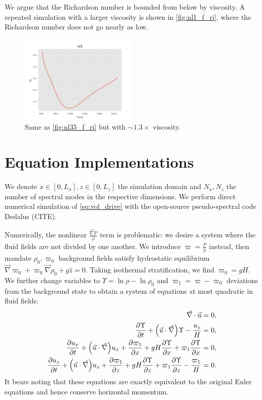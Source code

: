\documentclass[twocolumn,
        nofootinbib, %
        usenames, %
        aps,
        prd,
        dvipsnames %
    ]{revtex4-1}%
\newcommand*{\pd}[2]{\frac{\partial#1}{\partial#2}}
\DeclarePairedDelimiter\p{\lparen}{\rparen}
\begin{document}
We argue that the Richardson number is bounded from below by viscosity. A
repeated simulation with a larger viscosity is shown in \autoref{fig:nl1_f_ri},
where the Richardson number does not go nearly as low.
\begin{figure}[t]
    \centering
    \includegraphics[width=0.5\textwidth]{plots/nl1_f_ri.png}
    \caption{Same as \autoref{fig:nl35_f_ri} but with $\sim 1.3\times$
    viscosity.}\label{fig:nl1_f_ri}
\end{figure}

\clearpage
\onecolumngrid
\appendix

\section{Equation Implementations}\label{ss:strat_impl}

We denote $x \in [0, L_x], z \in [0, L_z]$ the simulation domain and $N_x, N_z$
the number of spectral modes in the respective dimensions. We perform direct
numerical simulation of \autoref{eq:vol_drive} with the open-source
pseudo-spectral code Dedalus (CITE).

Numerically, the nonlinear $\frac{\vec{\nabla}P}{\rho}$ term is problematic: we
desire a system where the fluid fields are not divided by one another. We
introduce $\varpi = \frac{P}{\rho}$ instead, then mandate $\rho_0, \varpi_0$
background fields satisfy hydrostatic equilibrium $\vec{\nabla}\varpi_0 +
\varpi_0 \vec{\nabla}\rho_0 + g\hat{z} = 0$. Taking isothermal stratification,
we find $\varpi_0 = gH$. We further change variables to $\Upsilon = \ln \rho -
\ln \rho_0$ and $\varpi_1 = \varpi - \varpi_0$ deviations from the background
state to obtain a system of equations at most quadratic in fluid fields:
\begin{subequations}\label{se:fc_var}
    \begin{align}
        \vec{\nabla} \cdot \vec{u} &= 0,\\
        \pd{\Upsilon}{t} + \p*{\vec{u} \cdot \vec{\nabla}} \Upsilon
            - \frac{u_z}{H} &= 0,\\
        \pd{u_x}{t} + \p*{\vec{u} \cdot \vec{\nabla}}u_x
            + \pd{\varpi_1}{x} + gH\pd{\Upsilon}{x}
            + \varpi_1 \pd{\Upsilon}{x} &= 0,\\
        \pd{u_z}{t} + \p*{\vec{u} \cdot \vec{\nabla}}u_z
            + \pd{\varpi_1}{z} + gH\pd{\Upsilon}{z}
            + \varpi_1 \pd{\Upsilon}{z} - \frac{\varpi_1}{H} &= 0.
    \end{align}
\end{subequations}
It bears noting that these equations are exactly equivalent to the original
Euler equations and hence conserve horizontal momentum.
\end{document}
